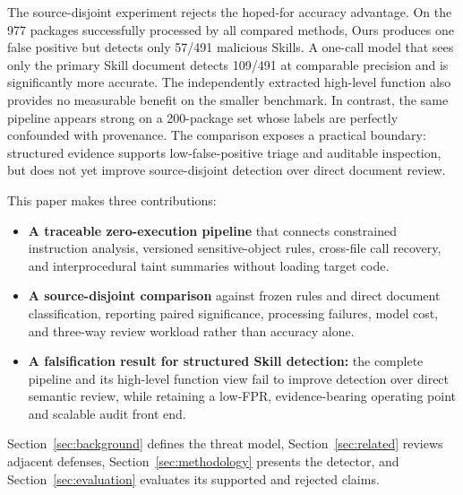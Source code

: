 The source-disjoint experiment rejects the hoped-for accuracy advantage. On
the 977 packages successfully processed by all compared methods, Ours produces
one false positive but detects only 57/491 malicious Skills. A one-call model
that sees only the primary Skill document detects 109/491 at comparable
precision and is significantly more accurate. The independently extracted
high-level function also provides no measurable benefit on the smaller
benchmark. In contrast, the same pipeline appears strong on a 200-package set
whose labels are perfectly confounded with provenance. The comparison exposes
a practical boundary: structured evidence supports low-false-positive triage
and auditable inspection, but does not yet improve source-disjoint detection
over direct document review.

This paper makes three contributions:
\begin{itemize}
  \item \textbf{A traceable zero-execution pipeline} that connects constrained
  instruction analysis, versioned sensitive-object rules, cross-file call
  recovery, and interprocedural taint summaries without loading target code.
  \item \textbf{A source-disjoint comparison} against frozen rules and direct
  document classification, reporting paired significance, processing failures,
  model cost, and three-way review workload rather than accuracy alone.
  \item \textbf{A falsification result for structured Skill detection:} the
  complete pipeline and its high-level function view fail to improve detection
  over direct semantic review, while retaining a low-FPR, evidence-bearing
  operating point and scalable audit front end.
\end{itemize}

Section~\ref{sec:background} defines the threat model,
Section~\ref{sec:related} reviews adjacent defenses,
Section~\ref{sec:methodology} presents the detector, and
Section~\ref{sec:evaluation} evaluates its supported and rejected claims.
